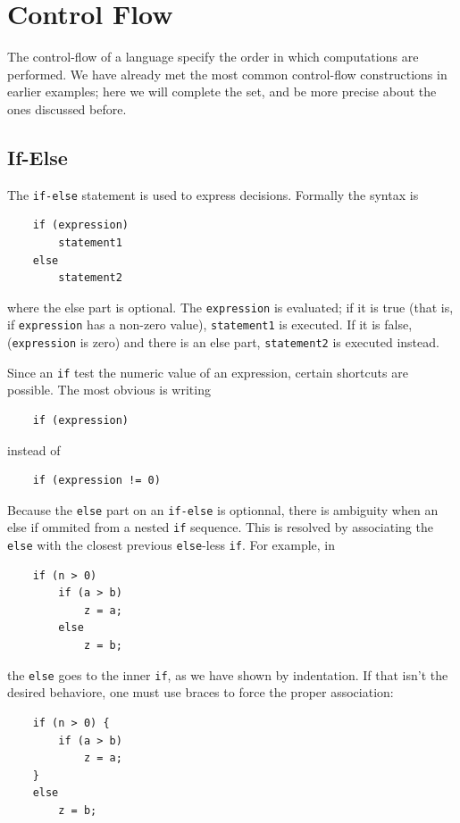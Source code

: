\documentclass{scrartcl}
\begin{document}
    \section{Control Flow}
        The control-flow of a language specify the order in which computations
        are performed. We have already met the most common control-flow constructions
        in earlier examples; here we will complete the set, and be more precise
        about the ones discussed before.
        \subsection{If-Else}
            The \texttt{if-else} statement is used to express decisions. Formally
            the syntax is
            \begin{lstlisting}
    if (expression)
        statement1
    else
        statement2
            \end{lstlisting}
            where the else part is optional. The \texttt{expression} is evaluated;
            if it is true (that is, if \texttt{expression} has a non-zero value),
            \texttt{statement1} is executed. If it is false, (\texttt{expression} is zero)
            and there is an else part, \texttt{statement2} is executed instead.

            Since an \texttt{if} test the numeric value of an expression, certain
            shortcuts are possible. The most obvious is writing
            \begin{lstlisting}
    if (expression)
            \end{lstlisting}
            instead of
            \begin{lstlisting}
    if (expression != 0)
            \end{lstlisting}
            Because the \texttt{else} part on an \texttt{if-else} is optionnal,
            there is ambiguity when an else if ommited from a nested \texttt{if}
            sequence. This is resolved by associating the \texttt{else} with
            the closest previous \texttt{else}-less \texttt{if}. For example, in
            \begin{lstlisting}
    if (n > 0)
        if (a > b)
            z = a;
        else
            z = b;
            \end{lstlisting}
            the \texttt{else} goes to the inner \texttt{if}, as we have shown by
            indentation. If that isn't the desired behaviore, one must use braces
            to force the proper association:
            \begin{lstlisting}
    if (n > 0) {
        if (a > b)
            z = a;
    }
    else
        z = b;
            \end{lstlisting}
\end{document}
